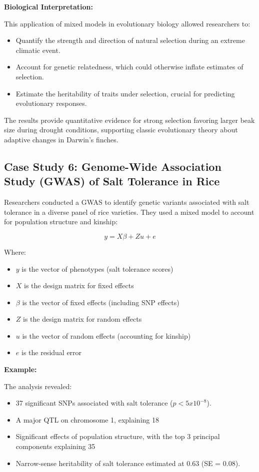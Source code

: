 \documentclass[12pt,a4paper]{article}
\newenvironment{example}[1][]
{\begin{basebox}[linecolor=uqgold]
\textbf{\color{uqgold}Example:} \textit{#1}\par\noindent\ignorespaces}
{\end{basebox}}
\newenvironment{interpretation}[1][]
{\begin{basebox}[linecolor=uqgreen]
\textbf{\color{uqgreen}Biological Interpretation:} \textit{#1}\par\noindent\ignorespaces}
{\end{basebox}}
\begin{document}
\begin{interpretation}
This application of mixed models in evolutionary biology allowed researchers to:
\begin{itemize}
    \item Quantify the strength and direction of natural selection during an extreme climatic event.
    \item Account for genetic relatedness, which could otherwise inflate estimates of selection.
    \item Estimate the heritability of traits under selection, crucial for predicting evolutionary responses.
\end{itemize}
The results provide quantitative evidence for strong selection favoring larger beak size during drought conditions, supporting classic evolutionary theory about adaptive changes in Darwin's finches.
\end{interpretation}

\subsection{Case Study 6: Genome-Wide Association Study (GWAS) of Salt Tolerance in Rice}

Researchers conducted a GWAS to identify genetic variants associated with salt tolerance in a diverse panel of rice varieties. They used a mixed model to account for population structure and kinship:

\[
y = X\beta + Zu + e
\]

Where:
\begin{itemize}
    \item $y$ is the vector of phenotypes (salt tolerance scores)
    \item $X$ is the design matrix for fixed effects
    \item $\beta$ is the vector of fixed effects (including SNP effects)
    \item $Z$ is the design matrix for random effects
    \item $u$ is the vector of random effects (accounting for kinship)
    \item $e$ is the residual error
\end{itemize}

\begin{example}
The analysis revealed:
\begin{itemize}
    \item 37 significant SNPs associated with salt tolerance ($p < 5 x 10^{-8}$).
    \item A major QTL on chromosome 1, explaining 18%
    \item Significant effects of population structure, with the top 3 principal components explaining 35%
    \item Narrow-sense heritability of salt tolerance estimated at 0.63 (SE = 0.08).
\end{itemize}
\end{example}
\end{document}
